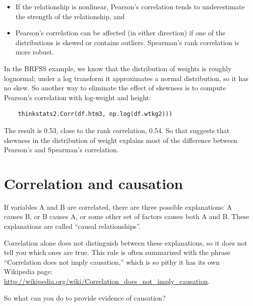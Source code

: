 \documentclass[12pt]{book}
\theoremstyle{exercise}
\begin{document}
\begin{itemize}

\item If the relationship is
nonlinear, Pearson's correlation tends to underestimate the strength
of the relationship, and%

\item Pearson's correlation can be affected (in either direction)
if one of the distributions is skewed or contains outliers.  Spearman's
rank correlation is more robust.%
%
%

\end{itemize}

In the BRFSS example, we know that the distribution of weights is
roughly lognormal; under a log transform it approximates a normal
distribution, so it has no skew.
So another way to eliminate the effect of skewness is to
compute Pearson's
correlation with log-weight and height:%
%

\begin{verbatim}
    thinkstats2.Corr(df.htm3, np.log(df.wtkg2)))
\end{verbatim}

The result is 0.53, close to the rank correlation, 0.54.  So that
suggests that skewness in the distribution of weight explains most of
the difference between Pearson's and Spearman's correlation.%
%
%


\section{Correlation and causation}%
%

If variables A and B are correlated, there are three possible
explanations: A causes B, or B causes A, or some other set of factors
causes both A and B.  These explanations are called ``causal
relationships''.%

Correlation alone does not distinguish between these explanations,
so it does not tell you which ones are true.
This rule is often summarized with the phrase ``Correlation
does not imply causation,'' which is so pithy it has its own
Wikipedia page: \url{http://wikipedia.org/wiki/Correlation_does_not_imply_causation}.

So what can you do to provide evidence of causation?
\end{document}

